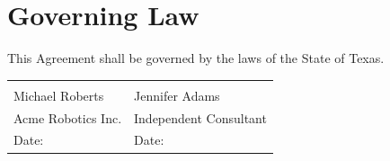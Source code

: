 \documentclass[11pt,a4paper]{article}
\begin{document}
\section{Governing Law}
This Agreement shall be governed by the laws of the State of Texas.

\vspace{1.8em}
\begin{tabularx}{\linewidth}{@{}X X@{}}
\underline{\hspace{5cm}} & \underline{\hspace{5cm}} \\
Michael Roberts & Jennifer Adams \\
Acme Robotics Inc. & Independent Consultant \\
Date: \underline{\hspace{2.5cm}} & Date: \underline{\hspace{2.5cm}} \\
\end{tabularx}
\end{document}
